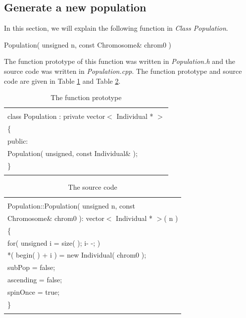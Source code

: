 \documentclass[twocolumn]{article}
\begin{document}
\subsection{Generate a new population}

\noindent
In this section, we will explain the following function in {\em Class
Population}.

\begin{center}
Population( unsigned n, const Chromosome\& chrom0 )
\end{center}

\noindent
The function prototype of this function was written in {\em
Population.h} and the source code was written in
{\em Population.cpp}. The function prototype and source code are given
in
Table \ref{FP1} and Table \ref{SC1}.

\begin{table}[h]
\begin{center}
\caption{The function prototype}
\label{FP1}
{\scriptsize
\begin{tabular}{|l|}\hline
\hspace*{7cm} \\
class Population : private vector$<$ Individual * $>$\\
\{\\
\hspace*{4mm} public:\\
\hspace*{8mm} Population( unsigned, const Individual\& );\\
\}\\
\\\hline
\end{tabular}
}
\end{center}
\end{table}

\begin{table}[h]
\begin{center}
\caption{The source code}
\label{SC1}
{\scriptsize
\begin{tabular}{|l|}\hline
\hspace*{7cm}\\
Population::Population( unsigned n,  const \\
\hspace*{4mm} Chromosome\& chrom0 ): vector$<$ Individual * $>$( n )\\
\{\\
\hspace*{4mm} for( unsigned i = size( ); i- -; )\\
\hspace*{8mm} *( begin( ) + i ) = new Individual( chrom0 );\\
\hspace*{4mm} subPop = false;\\
\hspace*{4mm} ascending = false;\\
\hspace*{4mm} spinOnce  = true;\\
\}\\
\\\hline
\end{tabular}
}
\end{center}
\end{table}
\end{document}

